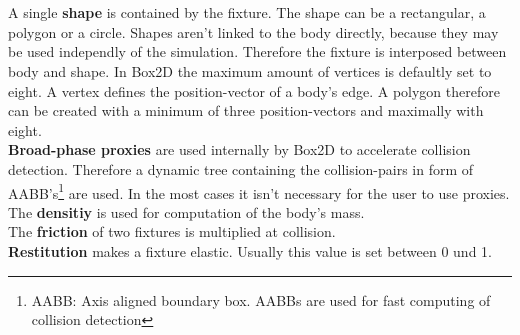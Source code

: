 \documentclass[10pt,a4paper,DIV=11]{scrreprt}
\begin{document}
   \\
\\

A single \textbf{shape} is contained by the fixture. The shape can be a rectangular, a polygon or a circle. Shapes aren't linked to the body directly, because they may be used independly of the simulation. Therefore the fixture is interposed between body and shape. In Box2D the maximum amount of vertices is defaultly set to eight. A vertex defines the position-vector of a body's edge. A polygon therefore can be created with a minimum of three position-vectors and maximally with eight.
\\

\textbf{Broad-phase proxies} are used internally by Box2D to accelerate collision detection. Therefore a dynamic tree containing the collision-pairs in form of AABB's\footnote{AABB: Axis aligned boundary box. AABBs are used for fast computing of collision detection} are used. In the most cases it isn't necessary for the user to use proxies. \\

The \textbf{densitiy} is used for computation of the body's mass.\\

The \textbf{friction} of two fixtures is multiplied at collision. \\

\textbf{Restitution} makes a fixture elastic. Usually this value is set between 0 und 1. \\
\end{document}
